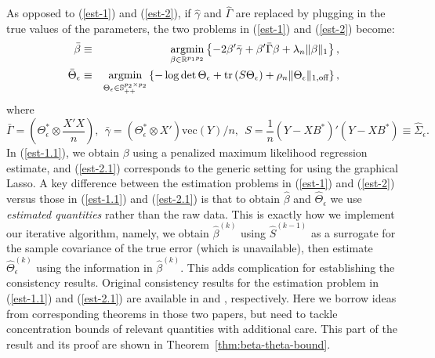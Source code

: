 \begin{remark} As opposed to (\ref{est-1}) and (\ref{est-2}), if $\widehat{\gamma}$ and $\widehat{\Gamma}$ are replaced by plugging in the true values of the parameters, the two problems in (\ref{est-1}) and (\ref{est-2}) become:
\begin{eqnarray}
\bar{\beta} & \equiv & \mathop{\text{argmin}}\limits_{\beta\in\mathbb{R}^{p_1p_2}}\left\{ -2\beta'\bar{\gamma} + \beta'\bar{\Gamma}\beta + \lambda_n\|\beta\|_1\right\}, \label{est-1.1}\\
\bar{\Theta}_\epsilon & \equiv & \mathop{\text{argmin}}\limits_{\Theta_\epsilon\in \mathbb{S}^{p_2\times p_2}_{++}} \left\{ -\log\det\Theta_\epsilon + \text{tr}\left( S\Theta_\epsilon\right) + \rho_n \|\Theta_\epsilon\|_{1,\text{off}}\right\}, \label{est-2.1}
\end{eqnarray}     
where 
\begin{equation*}
\bar{\Gamma} = \left(\Theta^*_\epsilon \otimes \frac{X'X}{n}\right), ~~ \bar{\gamma} = \left( \Theta^*_\epsilon \otimes X'\right) \mathrm{vec}(Y)/n, ~~ S = \frac{1}{n}\left( Y - XB^*\right)'\left( Y - XB^*\right)\equiv\widehat{\Sigma}_\epsilon.
\end{equation*}
In (\ref{est-1.1}), we obtain $\beta$ using a penalized maximum likelihood regression estimate, and (\ref{est-2.1}) corresponds to the generic setting for using the graphical Lasso. A key difference between the estimation problems in (\ref{est-1}) and (\ref{est-2}) versus those in (\ref{est-1.1}) and (\ref{est-2.1}) is that to obtain $\widehat{\beta}$ and $\widehat{\Theta}_\epsilon$ we use {\em estimated quantities} rather than the raw data. This is exactly how we implement our iterative algorithm, namely, we obtain $\widehat{\beta}^{(k)}$ using $\widehat{S}^{(k-1)}$ as a surrogate for the sample covariance of the true error (which is unavailable), then estimate $\widehat{\Theta}_\epsilon^{(k)}$ using the information in $\widehat{\beta}^{(k)}$. This adds complication for establishing the consistency results. Original consistency results for the estimation problem in (\ref{est-1.1}) and (\ref{est-2.1}) are available in \citet{basu2015estimation} and \citet{ravikumar2011high}, respectively. Here we borrow ideas from corresponding theorems in those two papers, but need to tackle concentration bounds of relevant quantities with additional care. This part of the result and its proof are shown in Theorem~\ref{thm:beta-theta-bound}. 
\end{remark}

